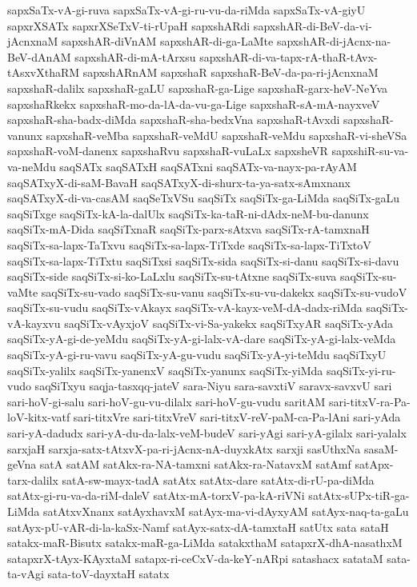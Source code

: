 {sapxSaTx-vA-gi-ruva
sapxSaTx-vA-gi-ru-vu-da-riMda
sapxSaTx-vA-giyU
sapxrXSATx
sapxrXSeTxV-ti-rUpaH
sapxshARdi
sapxshAR-di-BeV-da-vi-jAcnxnaM
sapxshAR-diVnAM
sapxshAR-di-ga-LaMte
sapxshAR-di-jAcnx-na-BeV-dAnAM
sapxshAR-di-mA-tArxsu
sapxshAR-di-va-tapx-rA-thaR-tAvx-tAsxvXthaRM
sapxshARnAM
sapxshaR
sapxshaR-BeV-da-pa-ri-jAcnxnaM
sapxshaR-dalilx
sapxshaR-gaLU
sapxshaR-ga-Lige
sapxshaR-garx-heV-NeYva
sapxshaRkekx
sapxshaR-mo-da-lA-da-vu-ga-Lige
sapxshaR-sA-mA-nayxveV
sapxshaR-sha-badx-diMda
sapxshaR-sha-bedxVna
sapxshaR-tAvxdi
sapxshaR-vanunx
sapxshaR-veMba
sapxshaR-veMdU
sapxshaR-veMdu
sapxshaR-vi-sheVSa
sapxshaR-voM-danenx
sapxshaRvu
sapxshaR-vuLaLx
sapxsheVR
sapxshiR-su-va-va-neMdu
saqSATx
saqSATxH
saqSATxni
saqSATx-va-nayx-pa-rAyAM
saqSATxyX-di-saM-BavaH
saqSATxyX-di-shurx-ta-ya-satx-sAmxnanx
saqSATxyX-di-va-casAM
saqSeTxVSu
saqSiTx
saqSiTx-ga-LiMda
saqSiTx-gaLu
saqSiTxge
saqSiTx-kA-la-dalUlx
saqSiTx-ka-taR-ni-dAdx-neM-bu-danunx
saqSiTx-mA-Dida
saqSiTxnaR
saqSiTx-parx-sAtxva
saqSiTx-rA-tamxnaH
saqSiTx-sa-lapx-TaTxvu
saqSiTx-sa-lapx-TiTxde
saqSiTx-sa-lapx-TiTxtoV
saqSiTx-sa-lapx-TiTxtu
saqSiTxsi
saqSiTx-sida
saqSiTx-si-danu
saqSiTx-si-davu
saqSiTx-side
saqSiTx-si-ko-LaLxlu
saqSiTx-su-tAtxne
saqSiTx-suva
saqSiTx-su-vaMte
saqSiTx-su-vado
saqSiTx-su-vanu
saqSiTx-su-vu-dakekx
saqSiTx-su-vudoV
saqSiTx-su-vudu
saqSiTx-vAkayx
saqSiTx-vA-kayx-veM-dA-dadx-riMda
saqSiTx-vA-kayxvu
saqSiTx-vAyxjoV
saqSiTx-vi-Sa-yakekx
saqSiTxyAR
saqSiTx-yAda
saqSiTx-yA-gi-de-yeMdu
saqSiTx-yA-gi-lalx-vA-dare
saqSiTx-yA-gi-lalx-veMda
saqSiTx-yA-gi-ru-vavu
saqSiTx-yA-gu-vudu
saqSiTx-yA-yi-teMdu
saqSiTxyU
saqSiTx-yalilx
saqSiTx-yanenxV
saqSiTx-yanunx
saqSiTx-yiMda
saqSiTx-yi-ru-vudo
saqSiTxyu
saqja-tasxqq-jateV
sara-Niyu
sara-savxtiV
saravx-savxvU
sari
sari-hoV-gi-salu
sari-hoV-gu-vu-dilalx
sari-hoV-gu-vudu
saritAM
sari-titxV-ra-Pa-loV-kitx-vatf
sari-titxVre
sari-titxVreV
sari-titxV-reV-paM-ca-Pa-lAni
sari-yAda
sari-yA-dadudx
sari-yA-du-da-lalx-veM-budeV
sari-yAgi
sari-yA-gilalx
sari-yalalx
sarxjaH
sarxja-satx-tAtxvX-pa-ri-jAcnx-nA-duyxkAtx
sarxji
sasUthxNa
sasaM-geVna
satA
satAM
satAkx-ra-NA-tamxni
satAkx-ra-NatavxM
satAmf
satApx-tarx-dalilx
satA-sw-mayx-tadA
satAtx
satAtx-dare
satAtx-di-rU-pa-diMda
satAtx-gi-ru-va-da-riM-daleV
satAtx-mA-torxV-pa-kA-riVNi
satAtx-sUPx-tiR-ga-LiMda
satAtxvXnanx
satAyxhavxM
satAyx-ma-vi-dAyxyAM
satAyx-naq-ta-gaLu
satAyx-pU-vAR-di-la-kaSx-Namf
satAyx-satx-dA-tamxtaH
satUtx
sata
sataH
satakx-maR-Bisutx
satakx-maR-ga-LiMda
satakxthaM
satapxrX-dhA-nasathxM
satapxrX-tAyx-KAyxtaM
satapx-ri-ceCxV-da-keY-nARpi
satashacx
satataM
sata-ta-vAgi
sata-toV-dayxtaH
satatx
}
